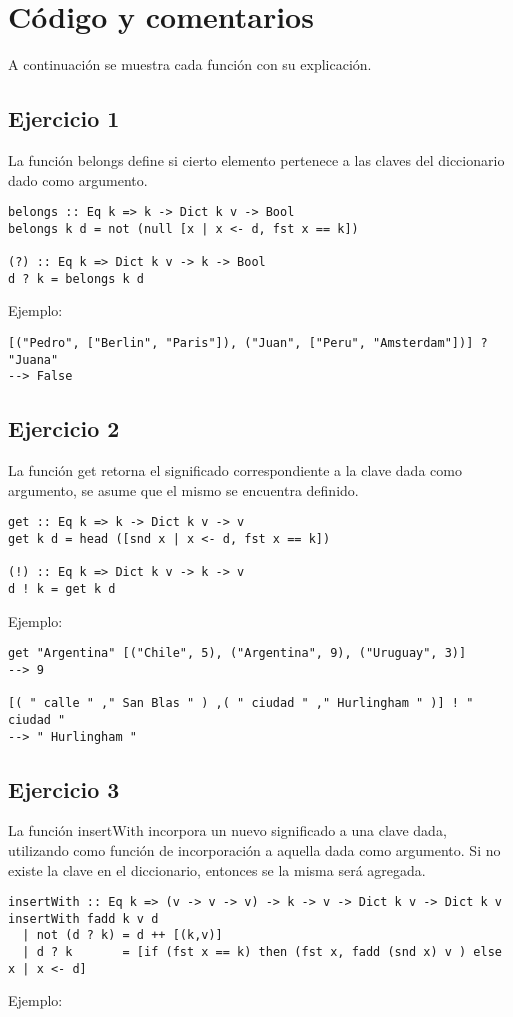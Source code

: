 \documentclass[10pt, a4paper,english,spanish,hidelinks]{article}
\begin{document}
\pagestyle{myheadings}
\maketitle
{}

\thispagestyle{empty}
\tableofcontents
\newpage
\section{Código y comentarios}
A continuación se muestra cada función con su explicación.

\subsection{Ejercicio 1}
La función belongs define si cierto elemento pertenece a las claves del diccionario dado como argumento.

\begin{verbatim}
belongs :: Eq k => k -> Dict k v -> Bool
belongs k d = not (null [x | x <- d, fst x == k])

(?) :: Eq k => Dict k v -> k -> Bool
d ? k = belongs k d
\end{verbatim}

Ejemplo:

\begin{verbatim}
[("Pedro", ["Berlin", "Paris"]), ("Juan", ["Peru", "Amsterdam"])] ? "Juana" 
--> False
\end{verbatim}

\subsection{Ejercicio 2}
La función get retorna el significado correspondiente a la clave dada como argumento, se asume que el mismo se encuentra definido.
\begin{verbatim}
get :: Eq k => k -> Dict k v -> v
get k d = head ([snd x | x <- d, fst x == k])

(!) :: Eq k => Dict k v -> k -> v 
d ! k = get k d
\end{verbatim}
Ejemplo:
\begin{verbatim}
get "Argentina" [("Chile", 5), ("Argentina", 9), ("Uruguay", 3)]
--> 9

[( " calle " ," San Blas " ) ,( " ciudad " ," Hurlingham " )] ! " ciudad "
--> " Hurlingham "
\end{verbatim}

\subsection{Ejercicio 3}
La función insertWith incorpora un nuevo significado a una clave dada, utilizando como función de incorporación a aquella dada como argumento. Si no existe la clave en el diccionario, entonces se la misma será agregada.
\begin{verbatim}
insertWith :: Eq k => (v -> v -> v) -> k -> v -> Dict k v -> Dict k v
insertWith fadd k v d
  | not (d ? k) = d ++ [(k,v)]
  | d ? k       = [if (fst x == k) then (fst x, fadd (snd x) v ) else x | x <- d]
\end{verbatim}
Ejemplo:
\end{document}
